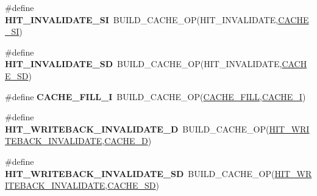 \begin{DoxyCompactItemize}
\item 
\mbox{\label{group__mips__regs_gac242f5aad045542064cfc8f7575db215}} 
\#define {\bfseries H\+I\+T\+\_\+\+I\+N\+V\+A\+L\+I\+D\+A\+T\+E\+\_\+\+SI}~B\+U\+I\+L\+D\+\_\+\+C\+A\+C\+H\+E\+\_\+\+OP(H\+I\+T\+\_\+\+I\+N\+V\+A\+L\+I\+D\+A\+TE,\mbox{\hyperlink{group__mips__regs_gaa127e30b313e010b0c7b53c97503b6ce}{C\+A\+C\+H\+E\+\_\+\+SI}})
\item 
\mbox{\label{group__mips__regs_ga2f21dd91cbb17b4b608a74b4e0066178}} 
\#define {\bfseries H\+I\+T\+\_\+\+I\+N\+V\+A\+L\+I\+D\+A\+T\+E\+\_\+\+SD}~B\+U\+I\+L\+D\+\_\+\+C\+A\+C\+H\+E\+\_\+\+OP(H\+I\+T\+\_\+\+I\+N\+V\+A\+L\+I\+D\+A\+TE,\mbox{\hyperlink{group__mips__regs_gae713c0e6cb5df3df0030d5d87bb16a6d}{C\+A\+C\+H\+E\+\_\+\+SD}})
\item 
\mbox{\label{group__mips__regs_gaecb0c142bbb0a42871768ee0869ba638}} 
\#define {\bfseries C\+A\+C\+H\+E\+\_\+\+F\+I\+L\+L\+\_\+I}~B\+U\+I\+L\+D\+\_\+\+C\+A\+C\+H\+E\+\_\+\+OP(\mbox{\hyperlink{group__mips__regs_gae1a9ea4d0a8c76c61375507cd5f31248}{C\+A\+C\+H\+E\+\_\+\+F\+I\+LL}},\mbox{\hyperlink{group__mips__regs_gac038c307d75c414069699d4c2741714f}{C\+A\+C\+H\+E\+\_\+I}})
\item 
\mbox{\label{group__mips__regs_gadd4da0ed5af2dbe414e7a7901b1b2da2}} 
\#define {\bfseries H\+I\+T\+\_\+\+W\+R\+I\+T\+E\+B\+A\+C\+K\+\_\+\+I\+N\+V\+A\+L\+I\+D\+A\+T\+E\+\_\+D}~B\+U\+I\+L\+D\+\_\+\+C\+A\+C\+H\+E\+\_\+\+OP(\mbox{\hyperlink{group__mips__regs_ga202defacfb0fb83e543baf9e75cb8221}{H\+I\+T\+\_\+\+W\+R\+I\+T\+E\+B\+A\+C\+K\+\_\+\+I\+N\+V\+A\+L\+I\+D\+A\+TE}},\mbox{\hyperlink{group__mips__regs_ga0fba561a0aa459e322839f78cc09f839}{C\+A\+C\+H\+E\+\_\+D}})
\item 
\mbox{\label{group__mips__regs_ga938236437abfa35484956ad6feac14dd}} 
\#define {\bfseries H\+I\+T\+\_\+\+W\+R\+I\+T\+E\+B\+A\+C\+K\+\_\+\+I\+N\+V\+A\+L\+I\+D\+A\+T\+E\+\_\+\+SD}~B\+U\+I\+L\+D\+\_\+\+C\+A\+C\+H\+E\+\_\+\+OP(\mbox{\hyperlink{group__mips__regs_ga202defacfb0fb83e543baf9e75cb8221}{H\+I\+T\+\_\+\+W\+R\+I\+T\+E\+B\+A\+C\+K\+\_\+\+I\+N\+V\+A\+L\+I\+D\+A\+TE}},\mbox{\hyperlink{group__mips__regs_gae713c0e6cb5df3df0030d5d87bb16a6d}{C\+A\+C\+H\+E\+\_\+\+SD}})
\item 
\mbox{\label{group__mips__regs_gaae7e1a4f7a39a524e237bef1bf5abe7b}} 

\end{DoxyCompactItemize}
